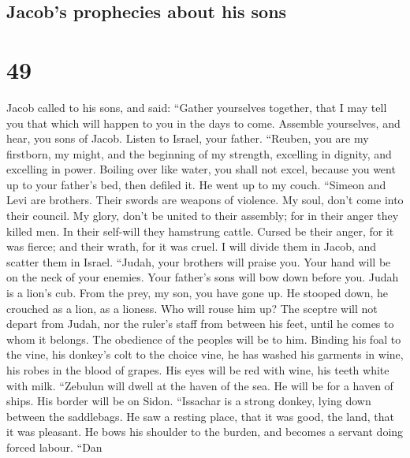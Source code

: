 \hypertarget{jacobs-prophecies-about-his-sons}{%
\subsection{Jacob's prophecies about his
sons}\label{jacobs-prophecies-about-his-sons}}

\hypertarget{section-48}{%
\section{49}\label{section-48}}

 Jacob called to his sons, and said: ``Gather yourselves
together, that I may tell you that which will happen to you in the days
to come.  Assemble yourselves, and hear, you sons of
Jacob. Listen to Israel, your father.  ``Reuben, you are
my firstborn, my might, and the beginning of my strength, excelling in
dignity, and excelling in power.  Boiling over like water,
you shall not excel, because you went up to your father's bed, then
defiled it. He went up to my couch.  ``Simeon and Levi are
brothers. Their swords are weapons of violence.  My soul,
don't come into their council. My glory, don't be united to their
assembly; for in their anger they killed men. In their self-will they
hamstrung cattle.  Cursed be their anger, for it was
fierce; and their wrath, for it was cruel. I will divide them in Jacob,
and scatter them in Israel.  ``Judah, your brothers will
praise you. Your hand will be on the neck of your enemies. Your father's
sons will bow down before you.  Judah is a lion's cub.
From the prey, my son, you have gone up. He stooped down, he crouched as
a lion, as a lioness. Who will rouse him up?  The sceptre
will not depart from Judah, nor the ruler's staff from between his feet,
until he comes to whom it belongs. The obedience of the peoples will be
to him.  Binding his foal to the vine, his donkey's colt
to the choice vine, he has washed his garments in wine, his robes in the
blood of grapes.  His eyes will be red with wine, his
teeth white with milk.  ``Zebulun will dwell at the haven
of the sea. He will be for a haven of ships. His border will be on
Sidon.  ``Issachar is a strong donkey, lying down between
the saddlebags.  He saw a resting place, that it was
good, the land, that it was pleasant. He bows his shoulder to the
burden, and becomes a servant doing forced labour.  ``Dan
